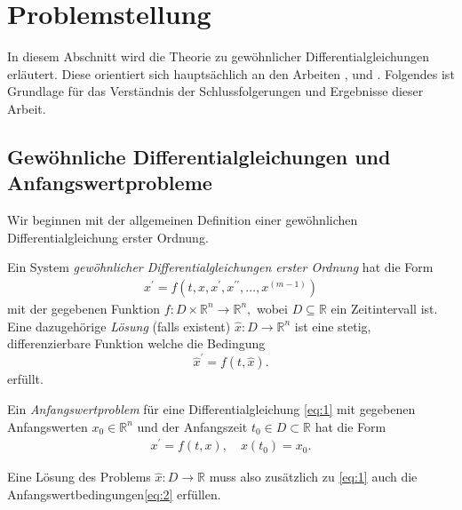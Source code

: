 \section{Problemstellung}
In diesem Abschnitt wird die Theorie zu gewöhnlicher Differentialgleichungen erläutert. Diese orientiert sich
hauptsächlich an den Arbeiten \cite{peterdeuflhardfolkmarbornemannNumerischeMathematikGewohnliche},
\cite{ernsthairergerhardwannerSolvingOrdinaryDifferential} und \cite{berndaulbachGewohnlicheDifferentialgleichungen2004}.
Folgendes ist Grundlage für das Verständnis der Schlussfolgerungen und Ergebnisse dieser Arbeit.

\subsection{Gewöhnliche Differentialgleichungen und Anfangswertprobleme}
Wir beginnen mit der allgemeinen Definition einer gewöhnlichen Differentialgleichung erster Ordnung.
\begin{definition}
    Ein System {\em gewöhnlicher Differentialgleichungen erster Ordnung} hat die Form
    \begin{align}
        x^{\prime} = f(t, x, x^{\prime}, x^{\prime\prime}, \dots, x^{(m-1)}) \label{eq:1}
    \end{align}
    mit der gegebenen Funktion
    $
    f : D \times \mathbb{R}^{n} \rightarrow \mathbb{R}^{n},
    $
    wobei $D \subseteq \mathbb{R}$ ein Zeitintervall ist. Eine dazugehörige {\em Lösung} (falls existent)
    $\hat{x} : D \rightarrow \mathbb{R}^n$ ist eine stetig, differenzierbare Funktion welche die Bedingung
    \[
        \hat{x}^{\prime} = f(t, \hat{x}).
    \]
    erfüllt.
\end{definition}
\begin{definition}
    Ein {\em Anfangswertproblem} für eine Differentialgleichung \eqref{eq:1} mit gegebenen Anfangswerten
    $x_{0} \in \mathbb{R}^{n}$ und der Anfangszeit $t_0 \in D \subset \mathbb{R}$ hat die Form
    \begin{align}
        x^{\prime} = f(t, x),\quad x(t_{0})=x_{0}. \label{eq:2}
    \end{align}
\end{definition}
Eine Lösung des Problems $\hat{x} : D \rightarrow \mathbb{R}$ muss also zusätzlich zu \eqref{eq:1} auch die
Anfangswertbedingungen\eqref{eq:2} erfüllen.
